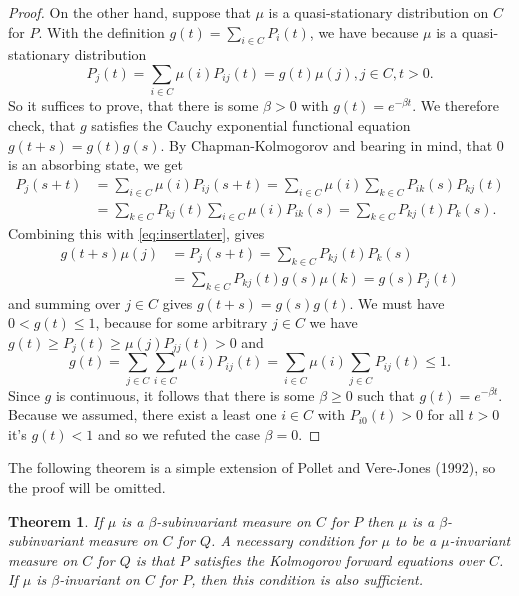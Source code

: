 \documentclass[12pt,a4paper]{scrartcl}
\newtheorem{theorem}{Theorem}[section]
\numberwithin{equation}{section}
\begin{document}
\begin{proof}
On the other hand, suppose that $\mu$ is a quasi-stationary distribution on $C$ for $P$. With the definition $g\left(t\right) = \sum_{i \in C} P_i\left(t\right)$, we have because $\mu$ is a quasi-stationary distribution
\begin{equation} \label{eq:insertlater}
P_j\left(t\right)= \sum_{i \in C} \mu\left(i\right) P_{ij}\left(t\right) = g\left(t\right) \mu\left(j\right) , j \in C , t > 0.
\end{equation}
So it suffices to prove, that there is some $\beta > 0$ with $g\left(t\right) = e^{-\beta t}.$ We therefore check, that $g$ satisfies the Cauchy exponential functional equation $g\left(t+s\right) = g\left(t\right) g\left(s\right).$ By Chapman-Kolmogorov and bearing in mind, that $0$ is an absorbing state, we get
\begin{align*}
P_j\left(s+t\right) &= \sum_{i \in C} \mu\left(i\right) P_{ij}\left(s+t\right) = \sum_{i \in C} \mu\left(i\right) \sum_{k \in C} P_{ik}\left(s\right) P_{kj}\left(t\right) \\
&= \sum_{k \in C} P_{kj}\left(t\right) \sum_{i \in C}\mu\left(i\right) P_{ik}\left(s\right) = \sum_{k \in C} P_{kj}\left(t\right) P_k\left(s\right).
\end{align*}
Combining this with \eqref{eq:insertlater}, gives
\begin{align*}
g\left(t+s\right) \mu\left(j\right) &= P_j\left(s+t\right) = \sum_{k \in C} P_{kj}\left(t\right) P_k\left(s\right) \\
&= \sum_{k \in C} P_{kj}\left(t\right) g\left(s\right) \mu\left(k\right) = g\left(s\right) P_j\left(t\right)
\end{align*}
and summing over $j \in C$ gives $g\left(t+s\right) = g\left(s\right) g\left(t\right).$ We must have $ 0 < g\left(t\right) \leq 1$, because for some arbitrary $j \in C$ we have $g\left(t\right) \geq P_j\left(t\right) \geq \mu\left(j\right) P_{jj}\left(t\right) > 0$ and 
$$g\left(t\right) = \sum_{j \in C}\sum_{i \in C} \mu\left(i\right) P_{ij}\left(t\right) = \sum_{i \in C} \mu\left(i\right) \sum_{j \in C} P_{ij}\left(t\right) \leq 1.$$
Since $g$ is continuous, it follows that there is some $\beta \geq 0$ such that $g\left(t\right) = e^{-\beta t}.$ Because we assumed, there exist a least one $i \in C$ with $P_{i0}\left(t\right) > 0$ for all $ t > 0$ it's $g\left(t\right) < 1$ and so we refuted the case $\beta = 0.$

\end{proof}

The following theorem is a simple extension of Pollet and Vere-Jones (1992), so the proof will be omitted.
\begin{theorem} \label{bigtheoremconnectionbetainvariantforPQ}
If $\mu$ is a $\beta$-subinvariant measure on $C$ for $P$ then $\mu$ is a $\beta$-subinvariant measure on $C$ for $Q$. A necessary condition for $\mu$ to be a $\mu$-invariant measure on $C$ for $Q$ is that $P$ satisfies the Kolmogorov forward equations over $C$. If $\mu$ is $\beta$-invariant on $C$ for $P$, then this condition is also sufficient. 
\end{theorem}
\end{document}

